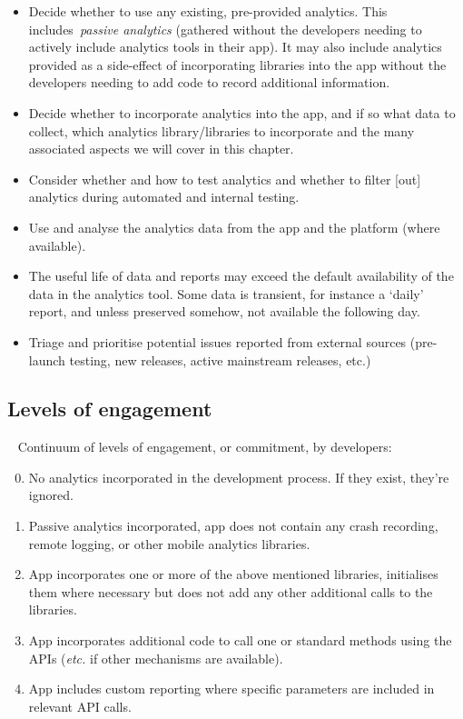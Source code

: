 \begin{itemize}
    \item Decide whether to use any existing, pre-provided analytics. This includes~\emph{passive analytics} (gathered without the developers needing to actively include analytics tools in their app). It may also include analytics provided as a side-effect of incorporating libraries into the app without the developers needing to add code to record additional information. 
    \item Decide whether to incorporate analytics into the app, and if so what data to collect, which analytics library/libraries to incorporate and the many associated aspects we will cover in this chapter.
    \item Consider whether and how to test analytics and whether to filter [out] analytics during automated and internal testing.
    \item Use and analyse the analytics data from the app and the platform (where available).
    \item The useful life of data and reports may exceed the default availability of the data in the analytics tool. Some data is transient, for instance a `daily' report, and unless preserved somehow, not available the following day.
    \item Triage and prioritise potential issues reported from external sources (pre-launch testing, new releases, active mainstream releases, etc.)
\end{itemize}

\subsection{Levels of engagement}~\label{subsection-levels-of-engagement}
Continuum of levels of engagement, or commitment, by developers:
\begin{enumerate}
    \setcounter{enumi}{-1} %
    \item No analytics incorporated in the development process. If they exist, they're ignored.
    \item Passive analytics incorporated, app does not contain any crash recording, remote logging, or other mobile analytics libraries.
    \item App incorporates one or more of the above mentioned libraries, initialises them where necessary but does not add any other additional calls to the libraries.
    \item App incorporates additional code to call one or standard methods using the APIs (\emph{etc.} if other mechanisms are available).
    \item App includes custom reporting where specific parameters are included in relevant API calls.
\end{enumerate}

